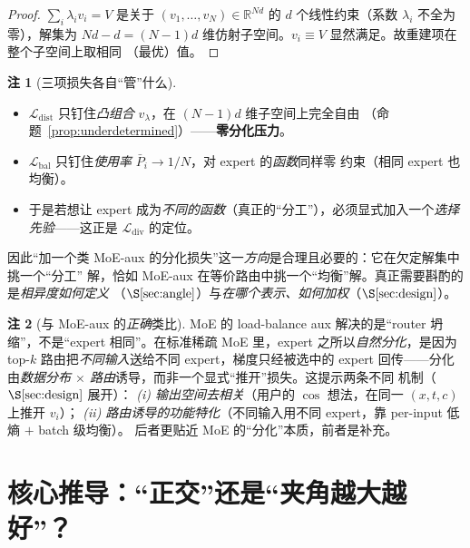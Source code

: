 \documentclass[11pt,a4paper]{article}
\newcommand{\loss}{\mathcal{L}}
\newcommand{\R}{\mathbb{R}}
\theoremstyle{definition}
\newtheorem{remark}{注}
\begin{document}
\begin{proof}
$\sum_i\lambda_i v_i=V$ 是关于 $(v_1,\dots,v_N)\in\R^{Nd}$ 的 $d$ 个线性约束（系数 $\lambda_i$ 不全为
零），解集为 $Nd-d=(N-1)d$ 维仿射子空间。$v_i\equiv V$ 显然满足。故重建项在整个子空间上取相同
（最优）值。
\end{proof}

\begin{remark}[三项损失各自``管''什么]
\label{rem:whatmanages}
\leavevmode
\begin{itemize}[leftmargin=1.5em]
\item $\loss_{\mathrm{dist}}$ 只钉住\emph{凸组合} $v_\lambda$，在 $(N-1)d$ 维子空间上完全自由
（命题~\ref{prop:underdetermined}）——\textbf{零分化压力}。
\item $\loss_{\mathrm{bal}}$ 只钉住\emph{使用率} $\bar P_i\to1/N$，对 expert 的\emph{函数}同样零
约束（相同 expert 也均衡）。
\item 于是若想让 expert 成为\emph{不同的函数}（真正的``分工''），必须显式加入一个\emph{选择
先验}——这正是 $\loss_{\mathrm{div}}$ 的定位。
\end{itemize}
因此``加一个类 MoE-aux 的分化损失''这一\emph{方向}是合理且必要的：它在欠定解集中挑一个``分工''
解，恰如 MoE-aux 在等价路由中挑一个``均衡''解。真正需要斟酌的是\emph{相异度如何定义}
（$\S\ref{sec:angle}$）与\emph{在哪个表示、如何加权}（$\S\ref{sec:design}$）。
\end{remark}

\begin{remark}[与 MoE-aux 的\emph{正确}类比]
\label{rem:moe_analogy}
MoE 的 load-balance aux 解决的是``router 坍缩''，不是``expert 相同''。在标准稀疏 MoE 里，expert
之所以\emph{自然分化}，是因为 top-$k$ 路由把\emph{不同输入}送给不同 expert，梯度只经被选中的
expert 回传——分化由\emph{数据分布 $\times$ 路由}诱导，而非一个显式``推开''损失。这提示两条不同
机制（$\S\ref{sec:design}$ 展开）：
\emph{(i) 输出空间去相关}（用户的 $\cos$ 想法，在同一 $(x,t,c)$ 上推开 $v_i$）；
\emph{(ii) 路由诱导的功能特化}（不同输入用不同 expert，靠 per-input 低熵 $+$ batch 级均衡）。
后者更贴近 MoE 的``分化''本质，前者是补充。
\end{remark}

\section{核心推导：``正交''还是``夹角越大越好''？}
\label{sec:angle}
\end{document}

